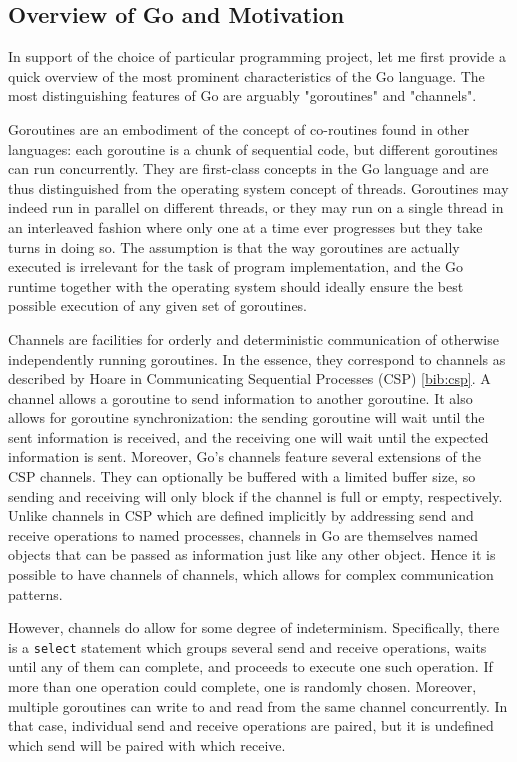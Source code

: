 \documentclass {article}
\begin{document}
\subsection{Overview of Go and Motivation}

In support of the choice of particular programming project, let me first provide
a quick overview of the most prominent characteristics of the Go language. The
most distinguishing features of Go are arguably "goroutines" and "channels".

Goroutines are an embodiment of the concept of co-routines found in other
languages: each goroutine is a chunk of sequential code, but different
goroutines can run concurrently. They are first-class concepts in the Go
language and are thus distinguished from the operating system concept of
threads. Goroutines may indeed run in parallel on different threads, or they may
run on a single thread in an interleaved fashion where only one at a time ever
progresses but they take turns in doing so. The assumption is that the way
goroutines are actually executed is irrelevant for the task of program
implementation, and the Go runtime together with the operating system should
ideally ensure the best possible execution of any given set of goroutines.

Channels are facilities for orderly and deterministic communication of otherwise
independently running goroutines. In the essence, they correspond to channels as
described by Hoare in Communicating Sequential Processes (CSP) \ref{bib:csp}. A
channel allows a goroutine to send information to another goroutine. It also
allows for goroutine synchronization: the sending goroutine will wait until the
sent information is received, and the receiving one will wait until the expected
information is sent. Moreover, Go's channels feature several extensions of the
CSP channels. They can optionally be buffered with a limited buffer size, so
sending and receiving will only block if the channel is full or empty,
respectively. Unlike channels in CSP which are defined implicitly by addressing
send and receive operations to named processes, channels in Go are themselves
named objects that can be passed as information just like any other object.
Hence it is possible to have channels of channels, which allows for complex
communication patterns.

However, channels do allow for some degree of indeterminism. Specifically, there
is a \lstinline|select| statement which groups several send and receive
operations, waits until any of them can complete, and proceeds to execute one
such operation. If more than one operation could complete, one is randomly
chosen. Moreover, multiple goroutines can write to and read from the same
channel concurrently. In that case, individual send and receive operations are
paired, but it is undefined which send will be paired with which receive.
\end{document}
